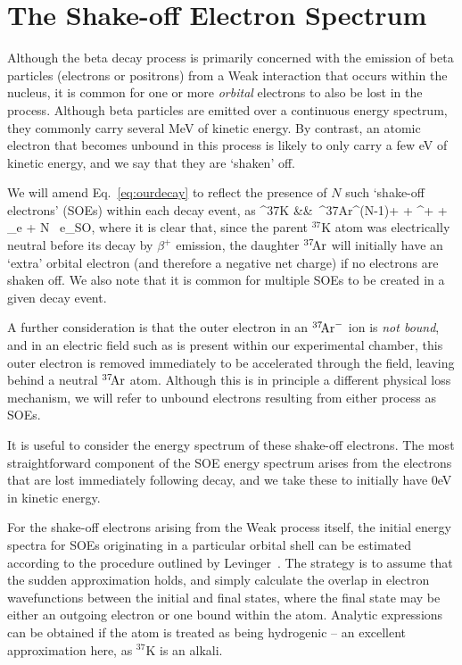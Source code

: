 \section{The Shake-off Electron Spectrum}
\label{section:soe_intro}
Although the beta decay process is primarily concerned with the emission of beta particles (electrons or positrons) from a Weak interaction that occurs within the nucleus, it is common for one or more \emph{orbital} electrons to also be lost in the process.  Although beta particles are emitted over a continuous energy spectrum, they commonly carry several MeV of kinetic energy.  By contrast, an atomic electron that becomes unbound in this process is likely to only carry a few eV of kinetic energy, and we say that they are `shaken' off.  

We will amend Eq.~\ref{eq:ourdecay} to reflect the presence of $N$ such `shake-off electrons' (SOEs) within each decay event, as
\bea
^{37}\textrm{K} &\rightarrow& \,^{37}\textrm{\!Ar}^{(N-1)+} + \beta^{+} + \nu_e + N \, e_{\textrm{SO}}, 
\label{eq:ourdecay_withsoe}
\eea
{}
where it is clear that, since the parent $^{37}\textrm{K}$ atom was electrically neutral before its decay by $\beta^+$ emission, the daughter $^{37}\textrm{\!Ar}$ will initially have an `extra' orbital electron (and therefore a negative net charge) if no electrons are shaken off.  We also note that it is common for multiple SOEs to be created in a given decay event.  

A further consideration is that the outer electron in an $^{37}\textrm{\!Ar}^{-}$ ion is \emph{not bound},~ and in an electric field such as is present within our experimental chamber, this outer electron is removed immediately to be accelerated through the field, leaving behind a neutral $^{37}\textrm{\!Ar}$ atom.  Although this is in principle a different physical loss mechanism, we will refer to unbound electrons resulting from either process as SOEs.  

It is useful to consider the energy spectrum of these shake-off electrons.  The most straightforward component of the SOE energy spectrum arises from the electrons that are lost immediately following decay, and we take these to initially have 0eV in kinetic energy.  

For the shake-off electrons arising from the Weak process itself, the initial energy spectra for SOEs originating in a particular orbital shell can be estimated according to the procedure outlined by Levinger~\cite{Levinger}.  The strategy is to assume that the sudden approximation holds, and simply calculate the overlap in electron wavefunctions between the initial and final states, where the final state may be either an outgoing electron or one bound within the atom.  Analytic expressions can be obtained if the atom is treated as being hydrogenic -- an excellent approximation here, as $^{37}\textrm{K}$ is an alkali.  

